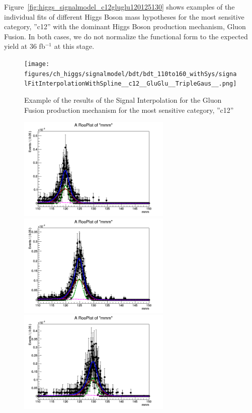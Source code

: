 Figure~\ref{fig:higgs_signalmodel_c12gluglu120125130} shows examples of the individual fits of different Higgs Boson mass hypotheses for the most sensitive category,  ''c12'' with the dominant Higgs Boson production mechanism, Gluon Fusion. In both cases, we do not normalize the functional form to the expected yield at 36 fb$^{-1}$ at this stage.
 \begin{figure}[htbp]
     \centering
     \texttt{[image: figures/ch\_higgs/signalmodel/bdt/bdt\_110to160\_withSys/signalFitInterpolationWithSpline\_\_c12\_\_GluGlu\_\_TripleGaus\_\_.png]}
     \caption{Example of the results of the Signal Interpolation for the Gluon Fusion production mechanism for the most sensitive category, ''c12''}
     \label{fig:higgs_signalmodel_c12glugluinterp}
 \end{figure}
 \begin{figure}[htbp]
     \centering
     \includegraphics[width=0.65\textwidth]{figures/signal_model/AppendixBdt/GluGlu/120/fit_mh_120_GluGlu_cat12.png}\\
     \includegraphics[width=0.65\textwidth]{figures/signal_model/AppendixBdt/GluGlu/125/fit_mh_125_GluGlu_cat12.png}\\
     \includegraphics[width=0.65\textwidth]{figures/signal_model/AppendixBdt/GluGlu/130/fit_mh_130_GluGlu_cat12.png}

\end{figure}
